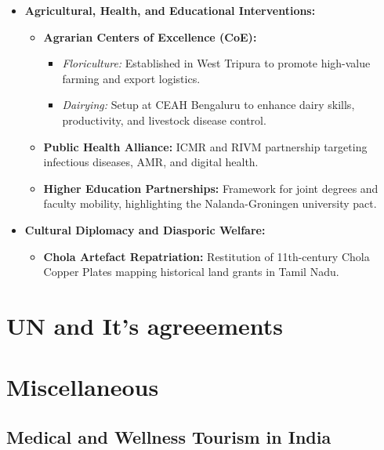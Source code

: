 \begin{itemize}
    \item \textbf{Agricultural, Health, and Educational Interventions:}
    \begin{itemize}
        \item \textbf{Agrarian Centers of Excellence (CoE):}
        \begin{itemize}
            \item \textit{Floriculture:} Established in West Tripura to promote high-value farming and export logistics.
            \item \textit{Dairying:} Setup at CEAH Bengaluru to enhance dairy skills, productivity, and livestock disease control.
        \end{itemize}
        \item \textbf{Public Health Alliance:} ICMR and RIVM partnership targeting infectious diseases, AMR, and digital health.
        \item \textbf{Higher Education Partnerships:} Framework for joint degrees and faculty mobility, highlighting the Nalanda-Groningen university pact.
    \end{itemize}

    \item \textbf{Cultural Diplomacy and Diasporic Welfare:}
    \begin{itemize}
        \item \textbf{Chola Artefact Repatriation:} Restitution of 11th-century Chola Copper Plates mapping historical land grants in Tamil Nadu.
    \end{itemize}
\end{itemize}


\section{UN and It's agreeements}
\section{Miscellaneous}
\subsection{Medical and Wellness Tourism in India}

